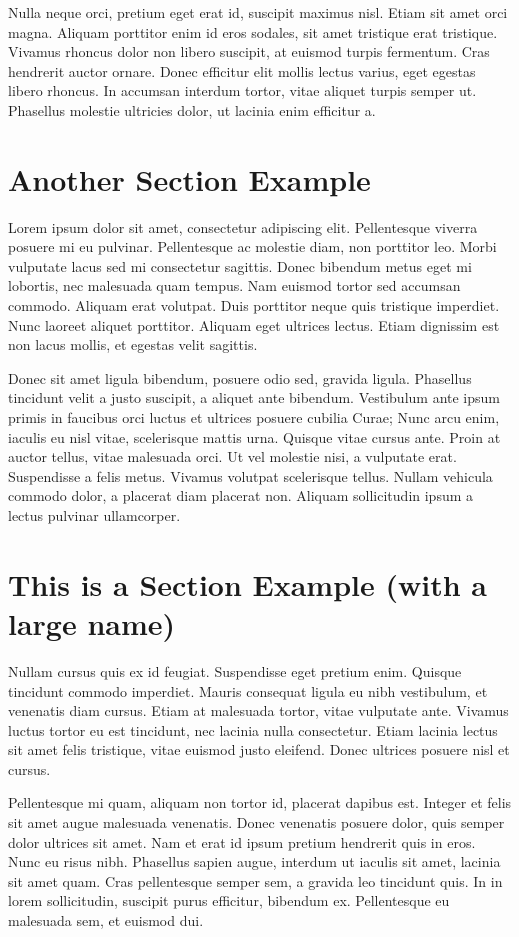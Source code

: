 \documentclass{arcanum}
\begin{document}
Nulla neque orci, pretium eget erat id, suscipit maximus nisl. Etiam sit amet
orci magna. Aliquam porttitor enim id eros sodales, sit amet tristique erat
tristique. Vivamus rhoncus dolor non libero suscipit, at euismod turpis fermentum.
Cras hendrerit auctor ornare. Donec efficitur elit mollis lectus varius, eget
egestas libero rhoncus. In accumsan interdum tortor, vitae aliquet turpis semper
ut. Phasellus molestie ultricies dolor, ut lacinia enim efficitur a.

\section{Another Section Example}
Lorem ipsum dolor sit amet, consectetur adipiscing elit. Pellentesque viverra
posuere mi eu pulvinar. Pellentesque ac molestie diam, non porttitor leo. Morbi
vulputate lacus sed mi consectetur sagittis. Donec bibendum metus eget mi lobortis,
nec malesuada quam tempus. Nam euismod tortor sed accumsan commodo. Aliquam erat
volutpat. Duis porttitor neque quis tristique imperdiet. Nunc laoreet aliquet
porttitor. Aliquam eget ultrices lectus. Etiam dignissim est non lacus mollis,
et egestas velit sagittis.

Donec sit amet ligula bibendum, posuere odio sed, gravida ligula. Phasellus tincidunt
velit a justo suscipit, a aliquet ante bibendum. Vestibulum ante ipsum primis in
faucibus orci luctus et ultrices posuere cubilia Curae; Nunc arcu enim, iaculis
eu nisl vitae, scelerisque mattis urna. Quisque vitae cursus ante. Proin at auctor
tellus, vitae malesuada orci. Ut vel molestie nisi, a vulputate erat. Suspendisse a
felis metus. Vivamus volutpat scelerisque tellus. Nullam vehicula commodo dolor,
a placerat diam placerat non. Aliquam sollicitudin ipsum a lectus pulvinar ullamcorper.

\section{This is a Section Example (with a large name)}
Nullam cursus quis ex id feugiat. Suspendisse eget pretium enim. Quisque
tincidunt commodo imperdiet. Mauris consequat ligula eu nibh vestibulum,
et venenatis diam cursus. Etiam at malesuada tortor, vitae vulputate ante.
Vivamus luctus tortor eu est tincidunt, nec lacinia nulla consectetur. Etiam
lacinia lectus sit amet felis tristique, vitae euismod justo eleifend. Donec
ultrices posuere nisl et cursus.

Pellentesque mi quam, aliquam non tortor id, placerat dapibus est. Integer et
felis sit amet augue malesuada venenatis. Donec venenatis posuere dolor, quis
semper dolor ultrices sit amet. Nam et erat id ipsum pretium hendrerit quis in
eros. Nunc eu risus nibh. Phasellus sapien augue, interdum ut iaculis sit amet,
lacinia sit amet quam. Cras pellentesque semper sem, a gravida leo tincidunt
quis. In in lorem sollicitudin, suscipit purus efficitur, bibendum ex.
Pellentesque eu malesuada sem, et euismod dui.
\end{document}
